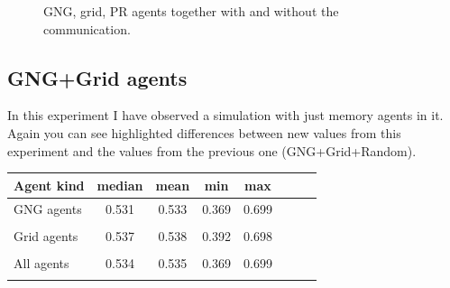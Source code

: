 

\begin{figure}[h!]
  \centering      
  \caption{GNG, grid, PR agents together with and without the communication.}
\end{figure} 
              
\clearpage
                                       
\subsection{GNG+Grid agents}

In this experiment I have observed a simulation with just memory agents in it. Again you can see highlighted differences between new values from this experiment and the values from the previous one (GNG+Grid+Random).


\begin{center} 
  \begin{tabular}{l*{6}{c}r}
  Agent kind        & median & mean & min & max \\
  \hline
  GNG agents        & 0.531                  & 0.533                 & 0.369                 & 0.699  \\  
                    & \color{green}{+0.017}  & \color{green}{+0.018} & \color{green}{+0.002}  & \color{green}{+0.018} \\
  Grid agents       & 0.537                  & 0.538                 & 0.392                & 0.698  \\  
                    & \color{green}{+0.018}  & \color{green}{+0.017} & \color{green}{+0.012}& \color{red}{-0.005}   \\
  All agents        & 0.534                  & 0.535                 & 0.369                 & 0.699  \\
                    & \color{green}{+0.016}  & \color{green}{+0.015}  & \color{red}{+0.003}  & \color{red}{-0.004} 
  \end{tabular}                       
\end{center}

